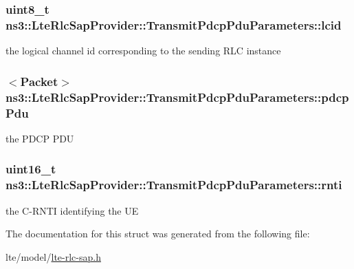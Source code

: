 \subsubsection[{\texorpdfstring{lcid}{lcid}}]{\setlength{\rightskip}{0pt plus 5cm}uint8\+\_\+t ns3\+::\+Lte\+Rlc\+Sap\+Provider\+::\+Transmit\+Pdcp\+Pdu\+Parameters\+::lcid}\hypertarget{structns3_1_1LteRlcSapProvider_1_1TransmitPdcpPduParameters_a1520cf6e30e8a17f56f2433ba1b0ea0f}{}\label{structns3_1_1LteRlcSapProvider_1_1TransmitPdcpPduParameters_a1520cf6e30e8a17f56f2433ba1b0ea0f}
the logical channel id corresponding to the sending R\+LC instance 
\subsubsection[{\texorpdfstring{pdcp\+Pdu}{pdcpPdu}}]{$<${\bf Packet}$>$ ns3\+::\+Lte\+Rlc\+Sap\+Provider\+::\+Transmit\+Pdcp\+Pdu\+Parameters\+::pdcp\+Pdu}\hypertarget{structns3_1_1LteRlcSapProvider_1_1TransmitPdcpPduParameters_ad9922f1c050ba920952f2462bd7f5b35}{}\label{structns3_1_1LteRlcSapProvider_1_1TransmitPdcpPduParameters_ad9922f1c050ba920952f2462bd7f5b35}
the P\+D\+CP P\+DU 
\subsubsection[{\texorpdfstring{rnti}{rnti}}]{\setlength{\rightskip}{0pt plus 5cm}uint16\+\_\+t ns3\+::\+Lte\+Rlc\+Sap\+Provider\+::\+Transmit\+Pdcp\+Pdu\+Parameters\+::rnti}\hypertarget{structns3_1_1LteRlcSapProvider_1_1TransmitPdcpPduParameters_ae45983256107cc1b165ad80052dd44be}{}\label{structns3_1_1LteRlcSapProvider_1_1TransmitPdcpPduParameters_ae45983256107cc1b165ad80052dd44be}
the C-\/\+R\+N\+TI identifying the UE 

The documentation for this struct was generated from the following file\+:\begin{DoxyCompactItemize}
\item 
lte/model/\hyperlink{lte-rlc-sap_8h}{lte-\/rlc-\/sap.\+h}\end{DoxyCompactItemize}
